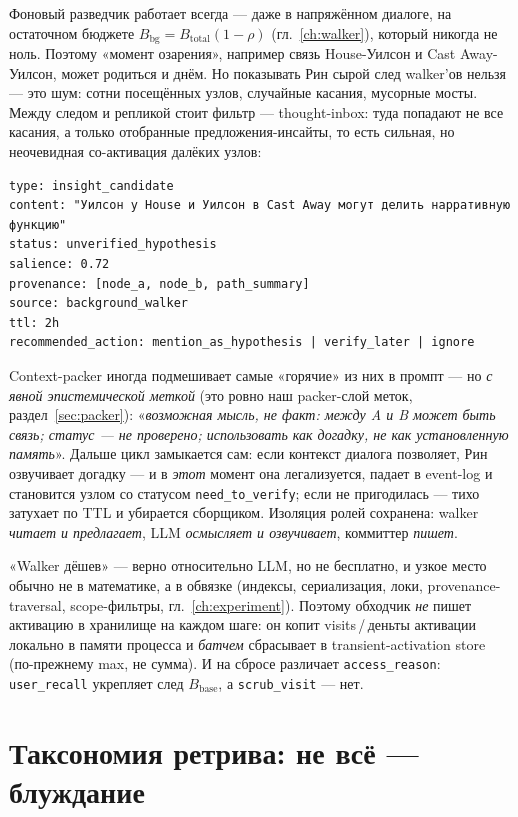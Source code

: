 Фоновый разведчик работает всегда — даже в напряжённом диалоге, на остаточном бюджете
$B_{\text{bg}}=B_{\text{total}}(1-\rho)$ (гл.~\ref{ch:walker}), который никогда не
ноль. Поэтому «момент озарения», например связь House-Уилсон и Cast Away-Уилсон,
может родиться и днём. Но показывать Рин сырой след walker'ов нельзя — это шум: сотни
посещённых узлов, случайные касания, мусорные мосты. Между следом и репликой стоит
фильтр — thought-inbox: туда попадают не все касания, а только отобранные
предложения-инсайты, то есть сильная, но неочевидная со-активация далёких узлов:
\begin{lstlisting}[style=pseudo]
type: insight_candidate
content: "Уилсон у House и Уилсон в Cast Away могут делить нарративную функцию"
status: unverified_hypothesis
salience: 0.72
provenance: [node_a, node_b, path_summary]
source: background_walker
ttl: 2h
recommended_action: mention_as_hypothesis | verify_later | ignore
\end{lstlisting}
Context-packer иногда подмешивает самые «горячие» из них в промпт — но \emph{с явной
эпистемической меткой} (это ровно наш packer-слой меток, раздел~\ref{sec:packer}):
«\emph{возможная мысль, не факт: между A и B может быть связь; статус — не проверено;
использовать как догадку, не как установленную память}». Дальше цикл замыкается сам:
если контекст диалога позволяет, Рин озвучивает догадку — и в \emph{этот} момент она
легализуется, падает в event-log и становится узлом со статусом
\texttt{need\_to\_verify}; если не пригодилась — тихо затухает по TTL и убирается
сборщиком. Изоляция ролей сохранена: walker \emph{читает и предлагает}, LLM
\emph{осмысляет и озвучивает}, коммиттер \emph{пишет}.

\begin{pitfall}
«Walker дёшев» — верно относительно LLM, но не бесплатно, и узкое место обычно не в
математике, а в обвязке (индексы, сериализация, локи, provenance-traversal,
scope-фильтры, гл.~\ref{ch:experiment}). Поэтому обходчик \emph{не} пишет активацию в
хранилище на каждом шаге: он копит visits\,/\,деньты активации локально в памяти
процесса и \emph{батчем} сбрасывает в transient-activation store (по-прежнему max, не
сумма). И на сбросе различает \texttt{access\_reason}: \texttt{user\_recall} укрепляет
след $B_{\text{base}}$, а \texttt{scrub\_visit} — нет.
\end{pitfall}

\section{Таксономия ретрива: не всё — блуждание}
\label{sec:retrievaltax}

